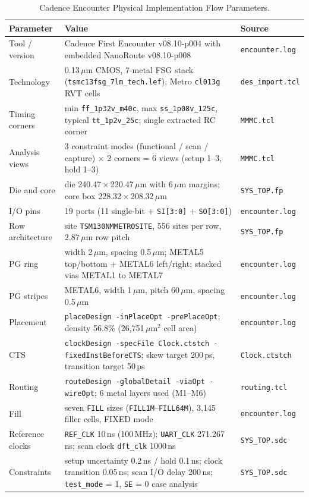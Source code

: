 \documentclass[11pt,a4paper]{article}
\begin{document}
\begin{table}[H]
\centering
\caption{Cadence Encounter Physical Implementation Flow Parameters.}
\label{tab:pnr_params}
\small
\renewcommand{\arraystretch}{1.25}
\begin{tabularx}{\textwidth}{|l|Y|l|}
\hline
\textbf{Parameter} & \textbf{Value} & \textbf{Source} \\
\hline
Tool / version & Cadence First Encounter v08.10-p004 with embedded NanoRoute v08.10-p008 & \texttt{encounter.log} \\
\hline
Technology & 0.13\,$\mu$m CMOS, 7-metal FSG stack (\texttt{tsmc13fsg\_7lm\_tech.lef}); Metro \texttt{cl013g} RVT cells & \texttt{des\_import.tcl} \\
\hline
Timing corners & min \texttt{ff\_1p32v\_m40c}, max \texttt{ss\_1p08v\_125c}, typical \texttt{tt\_1p2v\_25c}; single extracted RC corner & \texttt{MMMC.tcl} \\
\hline
Analysis views & 3 constraint modes (functional / scan / capture) $\times$ 2 corners = 6 views (setup 1--3, hold 1--3) & \texttt{MMMC.tcl} \\
\hline
Die and core & die 240.47\,$\times$\,220.47\,$\mu$m with 6\,$\mu$m margins; core box 228.32\,$\times$\,208.32\,$\mu$m & \texttt{SYS\_TOP.fp} \\
\hline
I/O pins & 19 ports (11 single-bit + \texttt{SI[3:0]} + \texttt{SO[3:0]}) & \texttt{encounter.log} \\
\hline
Row architecture & site \texttt{TSM130NMMETROSITE}, 556 sites per row, 2.87\,$\mu$m row pitch & \texttt{SYS\_TOP.fp} \\
\hline
PG ring & width 2\,$\mu$m, spacing 0.5\,$\mu$m; METAL5 top/bottom + METAL6 left/right; stacked vias METAL1 to METAL7 & \texttt{encounter.log} \\
\hline
PG stripes & METAL6, width 1\,$\mu$m, pitch 60\,$\mu$m, spacing 0.5\,$\mu$m & \texttt{encounter.log} \\
\hline
Placement & \texttt{placeDesign -inPlaceOpt -prePlaceOpt}; density 56.8\% (26,751\,$\mu$m$^2$ cell area) & \texttt{encounter.log} \\
\hline
CTS & \texttt{clockDesign -specFile Clock.ctstch -fixedInstBeforeCTS}; skew target 200\,ps, transition target 50\,ps & \texttt{Clock.ctstch} \\
\hline
Routing & \texttt{routeDesign -globalDetail -viaOpt -wireOpt}; 6 metal layers used (M1--M6) & \texttt{routing.tcl} \\
\hline
Fill & seven \texttt{FILL} sizes (\texttt{FILL1M}--\texttt{FILL64M}), 3,145 filler cells, FIXED mode & \texttt{encounter.log} \\
\hline
Reference clocks & \texttt{REF\_CLK} 10\,ns (100\,MHz); \texttt{UART\_CLK} 271.267\,ns; scan clock \texttt{dft\_clk} 1000\,ns & \texttt{SYS\_TOP.sdc} \\
\hline
Constraints & setup uncertainty 0.2\,ns / hold 0.1\,ns; clock transition 0.05\,ns; scan I/O delay 200\,ns; \texttt{test\_mode} = 1, \texttt{SE} = 0 case analysis & \texttt{SYS\_TOP.sdc} \\
\hline
\end{tabularx}
\end{table}
\end{document}
